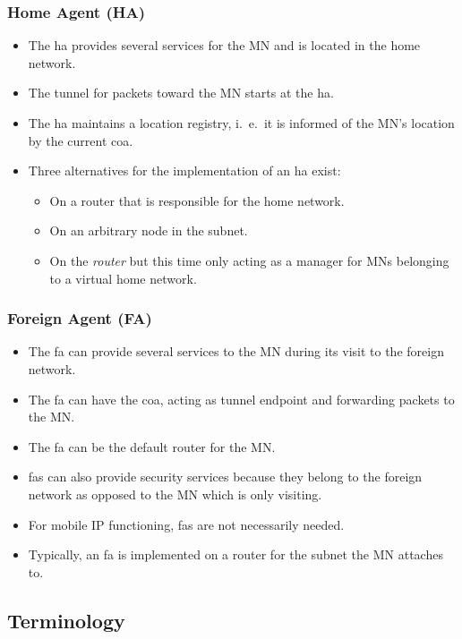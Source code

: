 \subsubsection[Home Agent]{Home Agent (HA)}
\begin{itemize}
	\item The \gls{ha} provides several services for the MN and is located in the home network.
	\item The tunnel for packets toward the MN starts at the \gls{ha}.
	\item The \gls{ha} maintains a location registry, i.\ e.\, it is informed of the MN's location by the current \gls{coa}. 
	\item Three alternatives for the implementation of an \gls{ha} exist:
	\begin{itemize}
			\item On a router that is responsible for the home network.
			\item On an arbitrary node in the subnet.
			\item On the \textit{router} but this time only acting as a manager for MNs belonging to a virtual home network. 
	\end{itemize}
\end{itemize}


\subsubsection[Foreign Agent]{Foreign Agent (FA)}
\begin{itemize}
	\item The \gls{fa} can provide several services to the MN during its visit to the foreign network. 
	\item The \gls{fa} can have the \gls{coa}, acting as tunnel endpoint and forwarding packets to the MN. 
	\item The \gls{fa} can be the default router for the MN. 
	\item \gls{fa}s can also provide security services because they belong to the foreign network as opposed to the MN which is only visiting.
	\item For mobile IP functioning, \gls{fa}s are not necessarily needed. 
	\item Typically, an \gls{fa} is implemented on a router for the subnet the MN attaches to.
\end{itemize}

\subsection*{Terminology}

